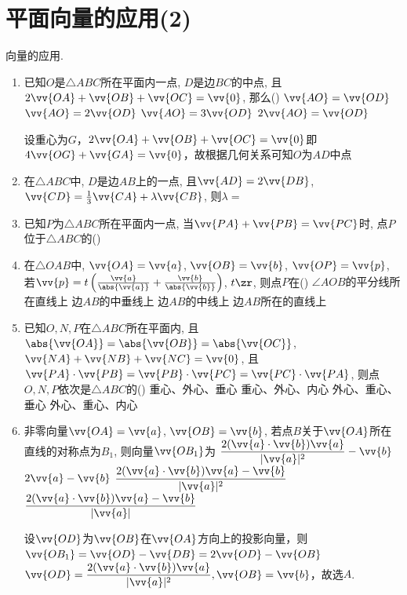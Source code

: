 \section*{平面向量的应用(2)}
\zsd 向量的应用. 
\begin{enumerate}
\item 已知$O$是$\triangle{ABC}$所在平面内一点, $D$是边$BC$的中点, 且$2\vv{OA}+\vv{OB}+\vv{OC}=\vv{0}$, 那么\dotfill()
\xx
{$\vv{AO}=\vv{OD}$}
{$\vv{AO}=2\vv{OD}$}
{$\vv{AO}=3\vv{OD}$}
{$2\vv{AO}=\vv{OD}$}
\begin{jieda}
    设重心为$G$，$2\vv{OA}+\vv{OB}+\vv{OC}=\vv{0}$即$4\vv{OG} + \vv{GA} = \vv{0}$，故根据几何关系可知$O$为$AD$中点
\end{jieda}


\item 在$\triangle{ABC}$中, $D$是边$AB$上的一点, 且$\vv{AD}=2\vv{DB}$, $\vv{CD}=\frac{1}{3}\vv{CA}+\lambda\vv{CB}$, 则$\lambda=$

\item 已知$P$为$\triangle{ABC}$所在平面内一点, 当$\vv{PA}+\vv{PB}=\vv{PC}$时, 点$P$位于$\triangle{ABC}$的\dotfill()


\item 在$\triangle{OAB}$中, $\vv{OA}=\vv{a}$, $\vv{OB}=\vv{b}$, $\vv{OP}=\vv{p}$, 
若$\vv{p}=t\left(\frac{\vv{a}}{\abs{\vv{a}}}+\frac{\vv{b}}{\abs{\vv{b}}}\right)$, $t\zr$, 则点$P$在\dotfill()
\xx
{$\angle{AOB}$的平分线所在直线上}
{边$AB$的中垂线上}
{边$AB$的中线上}
{边$AB$所在的直线上}


\item 已知$O,N,P$在$\triangle{ABC}$所在平面内, 且$\abs{\vv{OA}}=\abs{\vv{OB}}=\abs{\vv{OC}}$, $\vv{NA}+\vv{NB}+\vv{NC}=\vv{0}$, 
且$\vv{PA}\cdot\vv{PB}=\vv{PB}\cdot\vv{PC}=\vv{PC}\cdot\vv{PA}$, 则点$O,N,P$依次是$\triangle{ABC}$的\dotfill()
\xx
{重心、外心、垂心}
{重心、外心、内心}
{外心、重心、垂心}
{外心、重心、内心}

\item 非零向量$\vv{OA}=\vv{a}$, $\vv{OB}=\vv{b}$, 若点$B$关于$\vv{OA}$所在直线的对称点为$B_1$, 则向量$\vv{OB_1}$为
\xx
{$\dfrac{2(\vv{a}\cdot\vv{b})\vv{a}}{\vert\vv{a}\vert^2}-\vv{b}$}
{$2\vv{a}-\vv{b}$}
{$\dfrac{2(\vv{a}\cdot\vv{b})\vv{a}-\vv{b}}{\vert\vv{a}\vert^2}$}
{$\dfrac{2(\vv{a}\cdot\vv{b})\vv{a}-\vv{b}}{\vert\vv{a}\vert}$}
\begin{jieda}
    设$\vv{OD}$为$\vv{OB}$在$\vv{OA}$方向上的投影向量，则$\vv{OB_1} = \vv{OD} - \vv{DB} = 2\vv{OD} - \vv{OB}$\\
    $\vv{OD} = \dfrac{2(\vv{a}\cdot\vv{b})\vv{a}}{\vert\vv{a}\vert^2}, \vv{OB} = \vv{b}$，故选$A$.
\end{jieda}


\end{enumerate}
